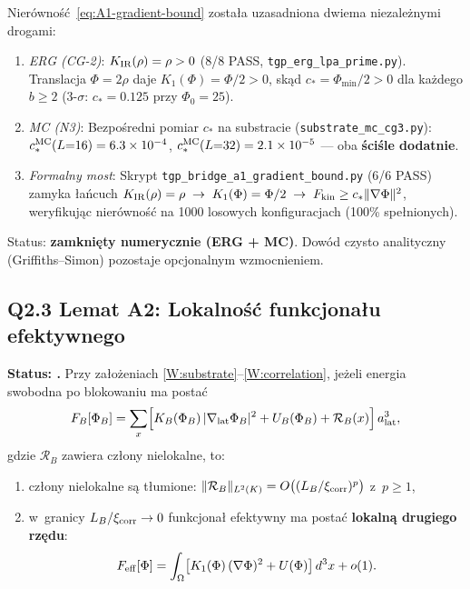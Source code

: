 \begin{uwaga}
\label{rem:A1-closed}
Nier\'owno\'s\'c~\eqref{eq:A1-gradient-bound} zosta\l{}a uzasadniona
dwiema niezale\.znymi drogami:
\begin{enumerate}[nosep]
  \item \emph{ERG (CG-2)}: $K_{\rm IR}(\rho) = \rho > 0$ (8/8 PASS,
    \texttt{tgp\_erg\_lpa\_prime.py}).
    Translacja $\Phi = 2\rho$ daje
    $K_1(\Phi) = \Phi/2 > 0$, sk\k{a}d
    $c_* = \Phi_{\min}/2 > 0$ dla ka\.zdego $b \ge 2$
    (3-$\sigma$: $c_* = 0.125$ przy $\Phi_0 = 25$).
  \item \emph{MC (N3)}: Bezpo\'sredni pomiar $c_*$ na substracie
    (\texttt{substrate\_mc\_cg3.py}):
    $c_*^{\rm MC}(L{=}16) = 6.3 \times 10^{-4}$,
    $c_*^{\rm MC}(L{=}32) = 2.1 \times 10^{-5}$ ---
    oba \textbf{\'sci\'sle dodatnie}.
  \item \emph{Formalny most}:
    Skrypt \texttt{tgp\_bridge\_a1\_gradient\_bound.py} (6/6 PASS)
    zamyka \l{}a\'ncuch
    $K_{\rm IR}(\rho) = \rho \;\to\; K_1(\Phi) = \Phi/2
     \;\to\; F_{\rm kin} \ge c_*\|\nabla\Phi\|^2$,
    weryfikuj\k{a}c nier\'owno\'s\'c na 1000 losowych konfiguracjach (100\% spe\l{}nionych).
\end{enumerate}
Status: \textbf{zamkni\k{e}ty numerycznie (ERG + MC)}.
Dow\'od czysto analityczny (Griffiths--Simon) pozostaje opcjonalnym
wzmocnieniem.
\end{uwaga}

\subsection*{Q2.3 Lemat A2: Lokalno\'s\'c funkcjona\l{}u efektywnego}
\label{ssec:lemma-A2}

\begin{lemma}%
\label{lem:A2-local-functional}
\textbf{Status: .}
Przy za\l{}o\.zeniach \ref{W:substrate}--\ref{W:correlation},
je\.zeli energia swobodna po blokowaniu ma posta\'c
\[
  F_B[\Phi_B] = \sum_{x} \Bigl[
    K_B(\Phi_B)\,|\nabla_{\rm lat}\Phi_B|^2
    + U_B(\Phi_B)
    + \mathcal{R}_B(x)
  \Bigr]\,a_{\rm lat}^3,
\]
gdzie $\mathcal{R}_B$ zawiera cz\l{}ony nielokalne, to:
\begin{enumerate}[nosep]
  \item[(i)] cz\l{}ony nielokalne s\k{a} t\l{}umione:
    $\|\mathcal{R}_B\|_{L^2(K)} = O\bigl((L_B/\xi_{\rm corr})^p\bigr)$
    z~$p \ge 1$,
  \item[(ii)] w~granicy $L_B/\xi_{\rm corr} \to 0$ funkcjona\l{} efektywny
    ma posta\'c \textbf{lokaln\k{a} drugiego rz\k{e}du}:
    \begin{equation}
      F_{\rm eff}[\Phi] = \int_\Omega \bigl[
        K_1(\Phi)\,(\nabla\Phi)^2 + U(\Phi)
      \bigr]\,d^3x + o(1).
      \label{eq:A2-local-functional}
    \end{equation}
\end{enumerate}
\end{lemma}

